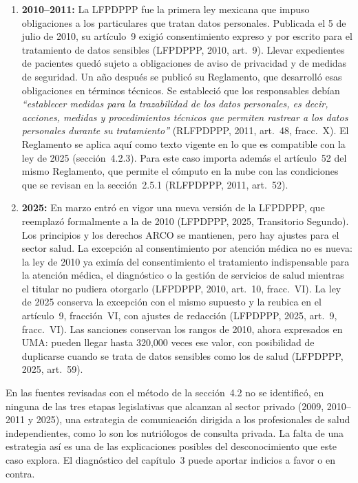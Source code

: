 \documentclass[12pt, a4paper]{article}
\begin{document}
\begin{enumerate}[label=\Roman*.]
  \item \textbf{2010--2011:} La LFPDPPP fue la primera ley mexicana
  que impuso obligaciones a los particulares que tratan datos
  personales. Publicada el 5 de julio de 2010, su artículo~9 exigió
  consentimiento expreso y por escrito para el tratamiento de datos
  sensibles (LFPDPPP, 2010, art.~9). Llevar expedientes de pacientes
  quedó sujeto a obligaciones de aviso de privacidad y de medidas de
  seguridad. Un año después se publicó su Reglamento, que desarrolló
  esas obligaciones en términos técnicos. Se estableció que los
  responsables debían \textit{``establecer medidas para la trazabilidad de los datos personales, es decir, acciones, medidas y procedimientos técnicos
  que permiten rastrear a los datos personales durante su tratamiento''}
  (RLFPDPPP, 2011, art.~48, fracc.~X). El
  Reglamento se aplica aquí como texto vigente
  en lo que es compatible con la ley de 2025 (sección~4.2.3). Para este caso importa además el
  artículo~52 del mismo Reglamento, que permite el cómputo en la nube con
  las condiciones que se revisan en la
  sección~2.5.1 (RLFPDPPP, 2011,
  art.~52).
 
  \item \textbf{2025:} En marzo entró en vigor una nueva versión de la
  LFPDPPP, que reemplazó formalmente a la de 2010 (LFPDPPP,
  2025, Transitorio Segundo). Los principios
  y los derechos ARCO se mantienen, pero hay ajustes para el sector
  salud. La excepción al consentimiento por atención médica no es nueva:
  la ley de 2010 ya eximía del consentimiento el tratamiento indispensable
  para la atención médica, el diagnóstico o la gestión de servicios de
  salud mientras el titular no pudiera otorgarlo (LFPDPPP, 2010, art.~10,
  fracc.~VI). La ley de 2025 conserva la excepción con el mismo supuesto y
  la reubica en el artículo~9, fracción~VI, con ajustes de redacción
  (LFPDPPP, 2025, art.~9, fracc.~VI). Las sanciones conservan los rangos de
  2010, ahora expresados en UMA:
  pueden llegar hasta 320,000 veces ese valor, con posibilidad de
  duplicarse cuando se trata de datos sensibles como los de salud
  (LFPDPPP, 2025, art.~59).
 
\end{enumerate}
 
En las fuentes revisadas con el método de la sección~4.2 no se
identificó, en ninguna de las tres etapas legislativas que alcanzan
al sector privado (2009, 2010--2011 y 2025), una estrategia de
comunicación dirigida a los profesionales de salud
independientes, como lo son los nutriólogos de consulta privada. La
falta de una estrategia así es una de las explicaciones posibles del
desconocimiento que este caso explora. El diagnóstico del capítulo~3
puede aportar indicios a favor o en contra.
 
\end{document}
